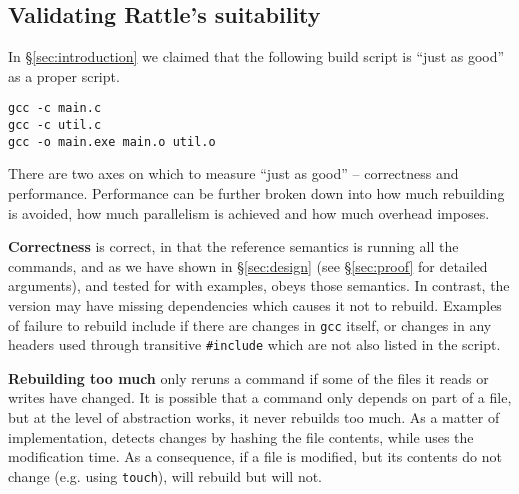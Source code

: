 \subsection{Validating Rattle's suitability}
\label{sec:eval:introduction}

In \S\ref{sec:introduction} we claimed that the following build script is ``just as good'' as a proper \Make script.

\begin{small}
\begin{verbatim}
gcc -c main.c
gcc -c util.c
gcc -o main.exe main.o util.o
\end{verbatim}
\end{small}

There are two axes on which to measure ``just as good'' -- correctness and performance. Performance can be further broken down into how much rebuilding is avoided, how much parallelism is achieved and how much overhead \Rattle imposes.

\textbf{Correctness} \Rattle is correct, in that the reference semantics is running all the commands, and as we have shown in \S\ref{sec:design} (see  \S\ref{sec:proof} for detailed arguments), and tested for with examples, \Rattle obeys those semantics. In contrast, the \Make version may have missing dependencies which causes it not to rebuild. Examples of failure to rebuild include if there are changes in \texttt{gcc} itself, or changes in any headers used through transitive \texttt{\#include} which are not also listed in the \Make script.

\textbf{Rebuilding too much} \Rattle only reruns a command if some of the files it reads or writes have changed. It is possible that a command only depends on part of a file, but at the level of abstraction \Rattle works, it never rebuilds too much. As a matter of implementation, \Rattle detects changes by hashing the file contents, while \Make uses the modification time. As a consequence, if a file is modified, but its contents do not change (e.g. using \texttt{touch}), \Make will rebuild but \Rattle will not.

